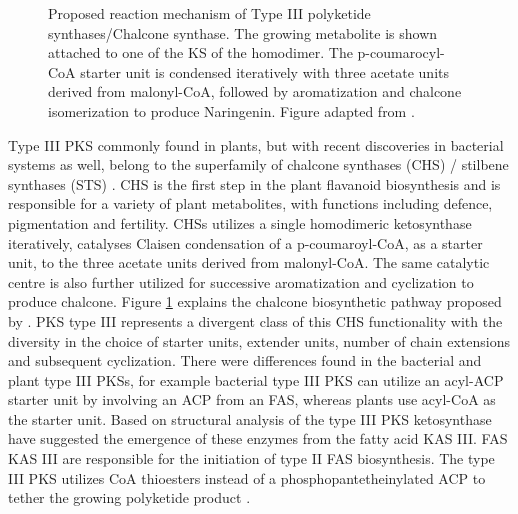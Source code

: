 			\setlength\fboxsep{5pt}
			\setlength\fboxrule{1.5pt}
			\begin{figure} []
			\centering
			\caption[Proposed reaction mechanism of Type III polyketide synthases/Chalcone synthase]{Proposed reaction mechanism of Type III polyketide synthases/Chalcone synthase. The growing metabolite is shown attached to one of the KS of the homodimer. The p-coumarocyl-CoA starter unit is condensed iteratively with three acetate units derived from malonyl-CoA, followed by aromatization and chalcone isomerization to produce Naringenin. Figure adapted from \parencite{Ferrer1999}.}
			\label{fig:CHS}
			\end{figure}
						
			Type III PKS commonly found in plants, but with recent discoveries in bacterial systems as well, belong to the superfamily of chalcone synthases (CHS)  / stilbene synthases (STS) . CHS is the first step in the plant flavanoid biosynthesis and is responsible for a variety of plant metabolites, with functions including defence, pigmentation and fertility.  CHSs utilizes a single homodimeric ketosynthase iteratively, catalyses Claisen condensation of a p-coumaroyl-CoA, as a starter unit, to the three acetate units derived from malonyl-CoA. The same catalytic centre is also further utilized for successive aromatization and cyclization to produce chalcone. Figure \ref{fig:CHS} explains the chalcone biosynthetic pathway proposed by \textcite{Ferrer1999}. PKS type III represents a divergent class of this CHS functionality with the diversity in the choice of starter units, extender units, number of chain extensions and subsequent cyclization. There were differences found in the bacterial and plant type III PKSs, for example bacterial type III PKS can utilize an acyl-ACP starter unit by involving an ACP from an FAS, whereas plants use acyl-CoA as the starter unit. Based on structural analysis of the type III PKS ketosynthase \textcite{Qiu2001a} have suggested the emergence of these enzymes from the fatty acid KAS III. FAS KAS III are responsible for the initiation of type II FAS biosynthesis. The type III PKS utilizes CoA thioesters instead of a phosphopantetheinylated ACP to tether the growing polyketide product \parencite{Austin2003}. 
			
